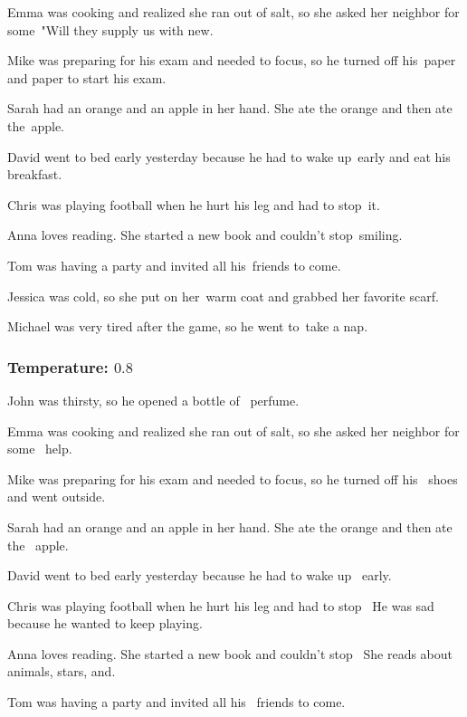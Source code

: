 \documentclass[11pt]{article}
\begin{document}
    Emma was cooking and realized she ran out of salt, so she asked her neighbor for some\textellipsis\ "Will they supply us with new.

    Mike was preparing for his exam and needed to focus, so he turned off his\textellipsis\ paper and paper to start his exam.

    Sarah had an orange and an apple in her hand. She ate the orange and then ate the\textellipsis\ apple.

    David went to bed early yesterday because he had to wake up\textellipsis\ early and eat his breakfast.

    Chris was playing football when he hurt his leg and had to stop\textellipsis\ it.

    Anna loves reading. She started a new book and couldn't stop\textellipsis\ smiling.

    Tom was having a party and invited all his\textellipsis\ friends to come.

    Jessica was cold, so she put on her\textellipsis\ warm coat and grabbed her favorite scarf.

    Michael was very tired after the game, so he went to\textellipsis\ take a nap.

    \subsubsection*{Temperature: $0.8$}

    John was thirsty, so he opened a bottle of \textellipsis\ perfume.

    Emma was cooking and realized she ran out of salt, so she asked her neighbor for some \textellipsis\ help.

    Mike was preparing for his exam and needed to focus, so he turned off his \textellipsis\ shoes and went outside.

    Sarah had an orange and an apple in her hand. She ate the orange and then ate the \textellipsis\ apple.

    David went to bed early yesterday because he had to wake up \textellipsis\ early.

    Chris was playing football when he hurt his leg and had to stop \textellipsis\  He was sad because he wanted to keep playing.

    Anna loves reading. She started a new book and couldn't stop \textellipsis\  She reads about animals, stars, and.

    Tom was having a party and invited all his \textellipsis\ friends to come.
\end{document}
